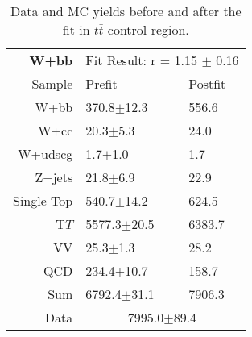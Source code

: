 \begin{table}[!htb]
\begin{center}
   \begin{tabular} {r|l|l} \hline \hline
\bf{W+bb} & \multicolumn{2}{c}{Fit Result: r = 1.15 $\pm$ 0.16}\\
        Sample          & Prefit                & Postfit \\
        \hline
        W+bb            &370.8$\pm$12.3 &556.6\\
        W+cc            &20.3$\pm$5.3   &24.0\\
        W+udscg         &1.7$\pm$1.0    &1.7\\
        Z+jets          &21.8$\pm$6.9   &22.9\\
        Single Top      &540.7$\pm$14.2 &624.5\\
        T$\bar{T}$      &5577.3$\pm$20.5&6383.7\\
        VV              &25.3$\pm$1.3   &28.2\\
        QCD             &234.4$\pm$10.7 &158.7\\
        \hline
        Sum             &6792.4$\pm$31.1&7906.3\\
        \hline
        Data&\multicolumn{2}{c}{7995.0$\pm$89.4}\\
        \hline\hline
   \end{tabular}
\caption{Data and MC yields before and after the fit in $t\bar{t}$ control region.}
\label{tab:fitYieldsJelenaTT}
\end{center}
\end{table}

